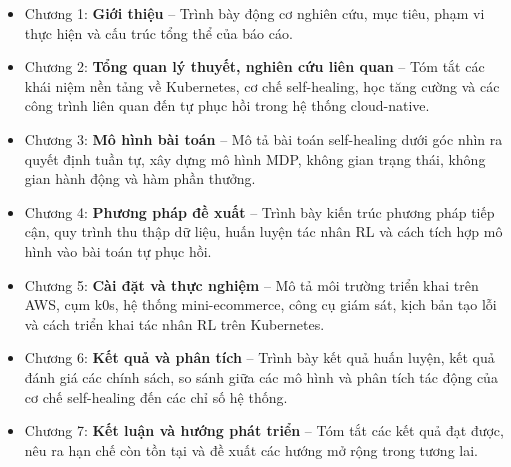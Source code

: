 \begin{itemize}
    \renewcommand{\labelitemi}{-}
    \item Chương 1: \textbf{Giới thiệu} -- Trình bày động cơ nghiên cứu, mục tiêu, phạm vi thực hiện và cấu trúc tổng thể của báo cáo.
    \item Chương 2: \textbf{Tổng quan lý thuyết, nghiên cứu liên quan} -- Tóm tắt các khái niệm nền tảng về Kubernetes, cơ chế self-healing, học tăng cường và các công trình liên quan đến tự phục hồi trong hệ thống cloud-native.
    \item Chương 3: \textbf{Mô hình bài toán} -- Mô tả bài toán self-healing dưới góc nhìn ra quyết định tuần tự, xây dựng mô hình MDP, không gian trạng thái, không gian hành động và hàm phần thưởng.
    \item Chương 4: \textbf{Phương pháp đề xuất} -- Trình bày kiến trúc phương pháp tiếp cận, quy trình thu thập dữ liệu, huấn luyện tác nhân RL và cách tích hợp mô hình vào bài toán tự phục hồi.
    \item Chương 5: \textbf{Cài đặt và thực nghiệm} -- Mô tả môi trường triển khai trên AWS, cụm k0s, hệ thống mini-ecommerce, công cụ giám sát, kịch bản tạo lỗi và cách triển khai tác nhân RL trên Kubernetes.
    \item Chương 6: \textbf{Kết quả và phân tích} -- Trình bày kết quả huấn luyện, kết quả đánh giá các chính sách, so sánh giữa các mô hình và phân tích tác động của cơ chế self-healing đến các chỉ số hệ thống.
    \item Chương 7: \textbf{Kết luận và hướng phát triển} -- Tóm tắt các kết quả đạt được, nêu ra hạn chế còn tồn tại và đề xuất các hướng mở rộng trong tương lai.
\end{itemize}

